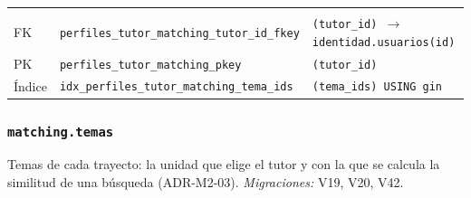 {\small
\begin{xltabular}{\textwidth}{@{}>{\raggedright\arraybackslash}p{1.7cm} >{\raggedright\arraybackslash}p{4.6cm} L@{}}
    \toprule
     &  &  \\
    \midrule
    \endfirsthead
    \toprule
     &  &  \\
    \midrule
    \endhead
    \bottomrule
    \endfoot
    FK & \texttt{perfiles\_\allowbreak{}tutor\_\allowbreak{}matching\_\allowbreak{}tutor\_\allowbreak{}id\_\allowbreak{}fkey} & \texttt{(\allowbreak{}tutor\_\allowbreak{}id) $\rightarrow$ identidad.usuarios(\allowbreak{}id)} \\
    PK & \texttt{perfiles\_\allowbreak{}tutor\_\allowbreak{}matching\_\allowbreak{}pkey} & \texttt{(\allowbreak{}tutor\_\allowbreak{}id)} \\
    Índice & \texttt{idx\_\allowbreak{}perfiles\_\allowbreak{}tutor\_\allowbreak{}matching\_\allowbreak{}tema\_\allowbreak{}ids} & \texttt{(\allowbreak{}tema\_\allowbreak{}ids) USING gin} \\
\end{xltabular}
}

\subsubsection{\texorpdfstring{\texttt{matching.temas}}{matching.temas}}\label{dd:matching.temas}

Temas de cada trayecto: la unidad que elige el tutor y con la que se calcula la similitud de una búsqueda (ADR-M2-03). \emph{Migraciones:} V19, V20, V42.

